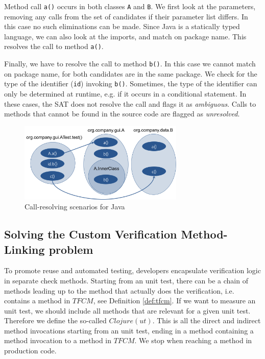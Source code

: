 \documentclass{uvamscse}
\begin{document}
Method call \texttt{a()} occurs in both classes \texttt{A} and \texttt{B}. We first look at the parameters, removing any calls from the set of candidates if their parameter list differs. In this case no such eliminations can be made. Since Java is a statically typed language, we can also look at the imports, and match on package name. This resolves the call to method \texttt{a()}. 

Finally, we have to resolve the call to method \texttt{b()}. In this case we cannot match on package name, for both candidates are in the same package. We check for the type of the identifier (\texttt{id}) invoking \texttt{b()}. Sometimes, the type of the identifier can only be determined at runtime, e.g. if it occurs in a conditional statement. In these cases, the SAT does not resolve the call and flags it as \emph{ambiguous}. Calls to methods that cannot be found in the source code are flagged as \emph{unresolved}.

\begin{figure}[!ht]
	
	\centering
	\includegraphics[width=0.7\textwidth]{figures/call_resolving.png}
	\caption{Call-resolving scenarios for Java}
	\label{fig:call_resolving}
\end{figure}

\subsection{Solving the Custom Verification Method-Linking problem}
\label{utClojure}
To promote reuse and automated testing, developers encapsulate verification logic in separate check methods. Starting from an unit test, there can be a chain of methods leading up to the method that actually does the verification, i.e. contains a method in $TFCM$, see Definition \ref{def:tfcm}. If we want to measure an unit test, we should include all methods that are relevant for a given unit test. Therefore we define the so-called $Clojure(ut)$. This is all the direct and indirect method invocations starting from an unit test, ending in a method containing a method invocation to a method in $TFCM$. We stop when reaching a method in production code. 
\end{document}
